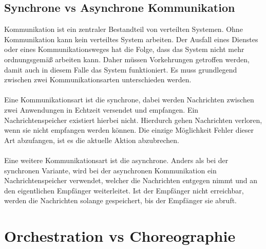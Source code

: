 \subsection{Synchrone vs Asynchrone Kommunikation}
\label{subsec:KommunikationASynchrone}
Kommunikation ist ein zentraler Bestandteil von verteilten Systemen. Ohne Kommunikation kann kein verteiltes System arbeiten. Der Ausfall eines Dienstes oder eines Kommunikationsweges hat die Folge, dass das System nicht mehr ordnungsgemäß arbeiten kann. Daher müssen Vorkehrungen getroffen werden, damit auch in diesem Falle das System funktioniert. Es muss grundlegend zwischen zwei Kommunikationsarten unterschieden werden.
\\\\
Eine Kommunikationsart ist die synchrone, dabei werden Nachrichten zwischen zwei Anwendungen in Echtzeit versendet und empfangen. Ein Nachrichtenspeicher existiert hierbei nicht. Hierdurch gehen Nachrichten verloren, wenn sie nicht empfangen werden können. Die einzige Möglichkeit Fehler dieser Art abzufangen, ist es die aktuelle Aktion abzubrechen.
\\\\
Eine weitere Kommunikationsart ist die asynchrone. Anders als bei der synchronen Variante, wird bei der asynchronen Kommunikation ein Nachrichtenspeicher verwendet, welcher die Nachrichten entgegen nimmt und an den eigentlichen Empfänger weiterleitet. Ist der Empfänger nicht erreichbar, werden die Nachrichten solange gespeichert, bis der Empfänger sie abruft.

\section{Orchestration vs Choreographie}
\label{sec:OrchestrationVsChoregraphie}

